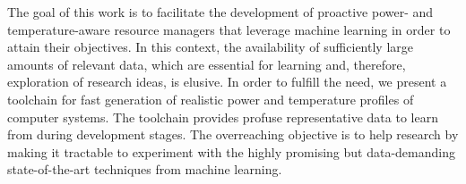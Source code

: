 The goal of this work is to facilitate the development of proactive
\mbox{power-} and temperature-aware resource managers that leverage machine
learning in order to attain their objectives. In this context, the availability
of sufficiently large amounts of relevant data, which are essential for learning
and, therefore, exploration of research ideas, is elusive. In order to fulfill
the need, we present a toolchain for fast generation of realistic power and
temperature profiles of computer systems. The toolchain provides profuse
representative data to learn from during development stages. The overreaching
objective is to help research by making it tractable to experiment with the
highly promising but data-demanding state-of-the-art techniques from machine
learning.
